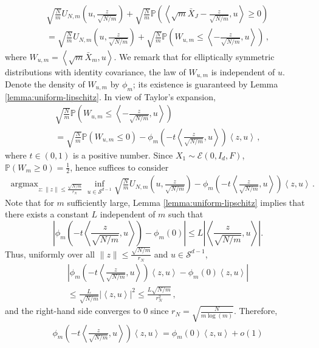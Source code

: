 \documentclass[12pt]{article}
\providecommand{\argmax}{\mathop\mathrm{arg max}} %
\def\l{\left}
\def\r{\right}
\newcommand{\mb}{\mathbb}
\newcommand{\dotp}[2]{\left\langle#1,#2\right\rangle}
\theoremstyle{thmstyletwo}%
\theoremstyle{thmstylethree}%
\begin{document}
\begin{multline*}
    \sqrt{\frac{N}{m}} U_{N,m}\l(u, \frac{z}{\sqrt{N/m}}\r) + \sqrt{\frac{N}{m}} \mb P \l(\dotp{\sqrt{m}\bar X_J - \frac{z}{\sqrt{N/m}}}{u}\geq 0\r) \\
    = \sqrt{\frac{N}{m}} U_{N,m}\l(u, \frac{z}{\sqrt{N/m}}\r)  +  \sqrt{\frac{N}{m}} \mb P \l(W_{u,m} \leq\dotp{-\frac{z}{\sqrt{N/m}}}{u}\r)\,,
\end{multline*}
where $W_{u,m} = \dotp{\sqrt{m} \bar X_m}{u}$. We remark that for  elliptically symmetric distributions with identity covariance, the law of $W_{u,m}$ is independent of $u$. Denote the density of $W_{u,m}$ by $\phi_m$; its existence is guaranteed by Lemma \ref{lemma:uniform-lipschitz}. In view of Taylor's expansion,
\begin{multline*}
    \sqrt{\frac{N}{m}} \mb P \l(W_{u,m} \leq\dotp{-\frac{z}{\sqrt{N/m}}}{u}\r) \\
    = \sqrt{\frac{N}{m}} \mb P \l(W_{u,m} \leq0\r) - \phi_m\l(-t \dotp{\frac{z}{\sqrt{N/m}}}{u}\r) \dotp{z}{u}\,,
\end{multline*}
where $t \in (0,1)$ is a positive number. Since $X_1 \sim \mathcal{E}\l(0, I_d, F\r)$, $\mb P \l(W_m\geq 0\r) = \frac{1}{2}$, hence suffices to consider
\begin{align*}
    \argmax_{z : \|z\| \leq \frac{\sqrt{N/m}}{r_N}}\inf_{u \in \mathcal{S}^{d-1}} \sqrt{\frac{N}{m}}  U_{N,m}\l(u, \frac{z}{\sqrt{N/m}}\r) - \phi_m\l(-t \dotp{\frac{z}{\sqrt{N/m}}}{u}\r) \dotp{z}{u} \,.
\end{align*}
Note that for $m$ sufficiently large, Lemma \ref{lemma:uniform-lipschitz} implies that there exists a constant $L$ independent of $m$ such that 
\[
\l\lvert \phi_m\l(-t \dotp{\frac{z}{\sqrt{N/m}}}{u}\r) - \phi_m\l(0\r) \r\rvert \leq L \l\lvert \dotp{\frac{z}{\sqrt{N/m}}}{u}\r\rvert. 
\]
Thus, uniformly over all $\|z\| \leq \frac{\sqrt{N/m}}{r_N}$ and $u \in \mathcal{S}^{d-1}$,
\begin{multline*}
    \l\lvert \phi_m\l(-t \dotp{\frac{z}{\sqrt{N/m}}}{u}\r) \dotp{z}{u} - \phi_m\l(0\r)\dotp{z}{u}\r\rvert \\
    \leq \frac{L}{\sqrt{N/m}} \l\lvert \dotp{z}{u}\r\rvert^2 \leq \frac{L\sqrt{N/m}}{r^2_N}\,,
\end{multline*}
and the right-hand side converges to $0$ since $r_N = \sqrt{\frac{N}{m \log(m)}}$. Therefore,
\begin{align*}
    \phi_m\l(-t \dotp{\frac{z}{\sqrt{N/m}}}{u}\r) \dotp{z}{u} = \phi_m(0)\dotp{z}{u} + o(1)
\end{align*}
\end{document}
